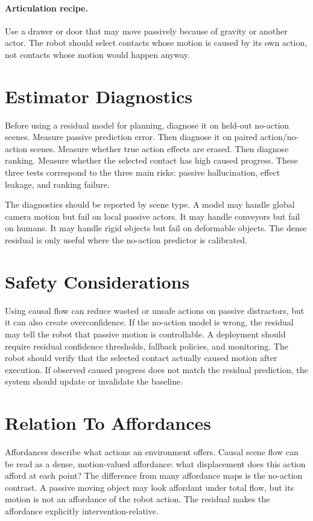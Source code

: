 \documentclass{article}
\begin{document}
\paragraph{Articulation recipe.}
Use a drawer or door that may move passively because of gravity or another actor.  The
robot should select contacts whose motion is caused by its own action, not contacts whose
motion would happen anyway.

\section{Estimator Diagnostics}

Before using a residual model for planning, diagnose it on held-out no-action scenes.
Measure passive prediction error.  Then diagnose it on paired action/no-action scenes.
Measure whether true action effects are erased.  Then diagnose ranking.  Measure whether
the selected contact has high caused progress.  These three tests correspond to the
three main risks: passive hallucination, effect leakage, and ranking failure.

The diagnostics should be reported by scene type.  A model may handle global camera
motion but fail on local passive actors.  It may handle conveyors but fail on humans.  It
may handle rigid objects but fail on deformable objects.  The dense residual is only
useful where the no-action predictor is calibrated.

\section{Safety Considerations}

Using causal flow can reduce wasted or unsafe actions on passive distractors, but it can
also create overconfidence.  If the no-action model is wrong, the residual may tell the
robot that passive motion is controllable.  A deployment should require residual
confidence thresholds, fallback policies, and monitoring.  The robot should verify that
the selected contact actually caused motion after execution.  If observed caused progress
does not match the residual prediction, the system should update or invalidate the
baseline.

\section{Relation To Affordances}

Affordances describe what actions an environment offers.  Causal scene flow can be read
as a dense, motion-valued affordance: what displacement does this action afford at each
point?  The difference from many affordance maps is the no-action contrast.  A passive
moving object may look affordant under total flow, but its motion is not an affordance of
the robot action.  The residual makes the affordance explicitly intervention-relative.
\end{document}
